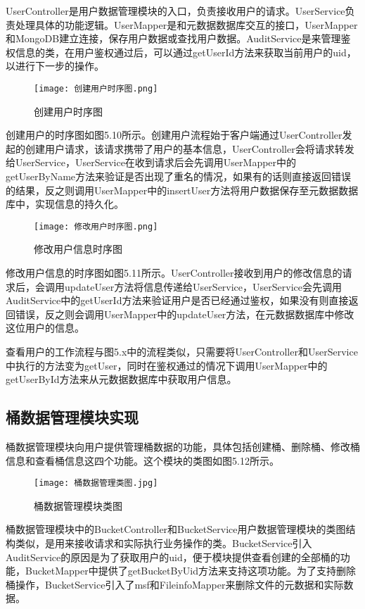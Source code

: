 UserController是用户数据管理模块的入口，负责接收用户的请求。UserService负责处理具体的功能逻辑。UserMapper是和元数据数据库交互的接口，UserMapper和MongoDB建立连接，保存用户数据或查找用户数据。AuditService是来管理鉴权信息的类，在用户鉴权通过后，可以通过getUserId方法来获取当前用户的uid，以进行下一步的操作。

\begin{figure}
  \centering
  \texttt{[image: 创建用户时序图.png]}
  \caption{创建用户时序图}
\end{figure}

创建用户的时序图如图5.10所示。创建用户流程始于客户端通过UserController发起的创建用户请求，该请求携带了用户的基本信息，UserController会将请求转发给UserService，UserService在收到请求后会先调用UserMapper中的getUserByName方法来验证是否出现了重名的情况，如果有的话则直接返回错误的结果，反之则调用UserMapper中的insertUser方法将用户数据保存至元数据数据库中，实现信息的持久化。

\begin{figure}
  \centering
  \texttt{[image: 修改用户时序图.png]}
  \caption{修改用户信息时序图}
\end{figure}

修改用户信息的时序图如图5.11所示。UserController接收到用户的修改信息的请求后，会调用updateUser方法将信息传递给UserService，UserService会先调用AuditService中的getUserId方法来验证用户是否已经通过鉴权，如果没有则直接返回错误，反之则会调用UserMapper中的updateUser方法，在元数据数据库中修改这位用户的信息。

查看用户的工作流程与图5.x中的流程类似，只需要将UserController和UserService中执行的方法变为getUser，同时在鉴权通过的情况下调用UserMapper中的getUserById方法来从元数据数据库中获取用户信息。

\subsection{桶数据管理模块实现}
桶数据管理模块向用户提供管理桶数据的功能，具体包括创建桶、删除桶、修改桶信息和查看桶信息这四个功能。这个模块的类图如图5.12所示。

\begin{figure}
  \centering
  \texttt{[image: 桶数据管理类图.jpg]}
  \caption{桶数据管理模块类图}
\end{figure}

桶数据管理模块中的BucketController和BucketService用户数据管理模块的类图结构类似，是用来接收请求和实际执行业务操作的类。BucketService引入AuditService的原因是为了获取用户的uid，便于模块提供查看创建的全部桶的功能，BucketMapper中提供了getBucketByUid方法来支持这项功能。为了支持删除桶操作，BucketService引入了msf和FileinfoMapper来删除文件的元数据和实际数据。

